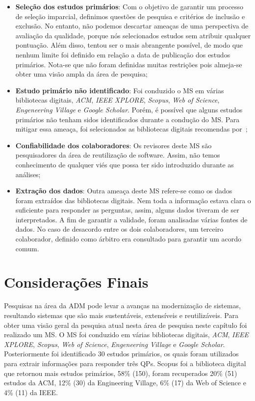 \begin{itemize}
\item \textbf{Seleção dos estudos primários}: Com o objetivo de garantir um processo de seleção imparcial, definimos questões de pesquisa e critérios de inclusão e exclusão.
No entanto, não podemos descartar ameaças de uma perspectiva de avaliação da qualidade, porque nós selecionados estudos sem atribuir qualquer pontuação. Além disso, tentou ser o mais abrangente possível, de modo que nenhum limite foi definido em relação a data de publicação dos estudos primários. Nota-se que não foram definidas muitas restrições pois almeja-se obter uma visão ampla da área de pesquisa;

\item \textbf{Estudo primário não identificado}: Foi conduzido o MS em várias bibliotecas digitais, \textit{ACM}, \textit{IEEE XPLORE}, \textit{Scopus}, \textit{Web of Science}, \textit{Engeneering Village} e \textit{Google Scholar}. Porém, é possível que alguns estudos primários não tenham sidos identificados durante a condução do MS. Para mitigar essa ameaça, foi selecionados as bibliotecas digitais recomendas por~;

\item \textbf{Confiabilidade dos colaboradores}: Os revisores deste MS são pesquisadores da área de reutilização de software. Assim, não temos conhecimento de qualquer viés que possa ter sido introduzido durante as análises;

\item \textbf{Extração dos dados}: Outra ameaça deste MS refere-se como os dados foram extraídos das bibliotecas digitais. Nem toda a informação estava clara o suficiente para responder as perguntas, assim, alguns dados tiveram de ser interpretados.
A fim de garantir a validade, foram analisadas várias fontes de dados. No caso de desacordo entre os dois colaboradores, um terceiro colaborador, definido como árbitro era consultado para garantir um acordo comum.

\end{itemize}


\section{Considerações Finais}

Pesquisas na área da ADM pode levar a avanças na modernização de sistemas, resultando sistemas que são mais sustentáveis, extensíveis e reutilizáveis. Para obter uma visão geral da pesquisa atual nesta área de pesquisa neste capítulo foi realizado um MS. O MS foi conduzido em várias bibliotecas digitais, \textit{ACM}, \textit{IEEE XPLORE}, \textit{Scopus}, \textit{Web of Science}, \textit{Engeneering Village} e \textit{Google Scholar}. Posteriormente foi identificado 30 estudos primários, os quais foram utilizados para extrair informações para responder três QPs. Scopus foi a biblioteca digital que retornou mais estudos primários, 58\% (150), foram recuperados 20\% (51) estudos da ACM, 12\% (30) da Engineering Village, 6\% (17) da Web of Science e 4\% (11) da IEEE. 

